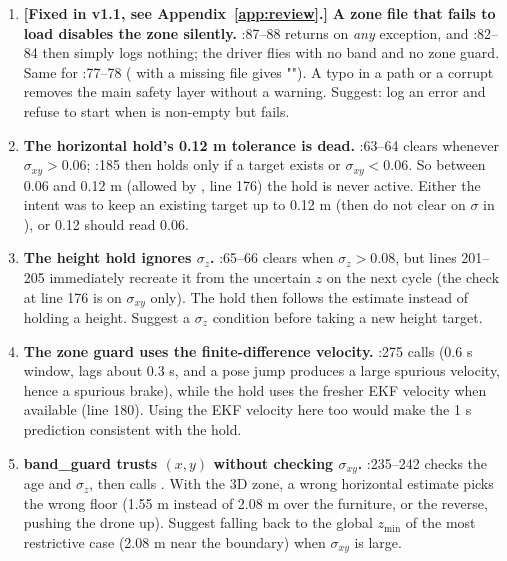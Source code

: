 \begin{review}
\begin{enumerate}[leftmargin=*,itemsep=3pt]
\item \textcolor{OliveGreen}{\textbf{[Fixed in v1.1, see Appendix~\ref{app:review}.]}} \textbf{A zone file that fails to load disables the zone silently.} :87--88 returns
 on \emph{any} exception, and :82--84 then simply logs nothing; the driver flies with
no band and no zone guard. Same for :77--78 ( with a missing file gives ""). A
typo in a path or a corrupt  removes the main safety layer without a warning. Suggest: log an error and
refuse to start when  is non-empty but  fails.

\item \textbf{The horizontal hold's 0.12 m tolerance is dead.} :63--64 clears 
whenever $\sigma_{xy}>0.06$; :185 then holds only if a target exists or $\sigma_{xy}<0.06$. So
between 0.06 and 0.12 m (allowed by , line 176) the hold is never active. Either the
intent was to keep an existing target up to 0.12 m (then do not clear on $\sigma$ in ), or 0.12
should read 0.06.

\item \textbf{The height hold ignores $\sigma_z$.} :65--66 clears  when
$\sigma_z>0.08$, but lines 201--205 immediately recreate it from the uncertain $z$ on the next cycle (the check
at line 176 is on $\sigma_{xy}$ only). The hold then follows the estimate instead of holding a height. Suggest a
$\sigma_z$ condition before taking a new height target.

\item \textbf{The zone guard uses the finite-difference velocity.} :275 calls
 (0.6 s window, lags about 0.3 s, and a pose jump produces a large spurious velocity, hence a
spurious brake), while the hold uses the fresher EKF velocity when available (line 180). Using the EKF velocity
here too would make the 1 s prediction consistent with the hold.

\item \textbf{band\_guard trusts $(x,y)$ without checking $\sigma_{xy}$.} :235--242 checks the age
and $\sigma_z$, then calls . With the 3D zone, a wrong horizontal estimate
picks the wrong floor (1.55 m instead of 2.08 m over the furniture, or the reverse, pushing the drone up). Suggest
falling back to the global $z_{\min}$ of the most restrictive case (2.08 m near the boundary) when
$\sigma_{xy}$ is large.


\end{enumerate}
\end{review}
